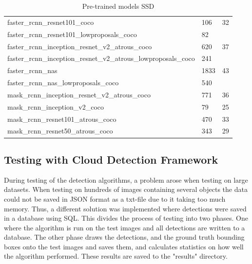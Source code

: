 \begin{table}[h!]
\begin{tabular}{lll}
faster\_rcnn\_resnet101\_coco                                   & 106         & 32                                \\
faster\_rcnn\_resnet101\_lowproposals\_coco                     & 82          &                                   \\
faster\_rcnn\_inception\_resnet\_v2\_atrous\_coco               & 620         & 37                                \\
faster\_rcnn\_inception\_resnet\_v2\_atrous\_lowproposals\_coco & 241         &                                   \\
faster\_rcnn\_nas                                               & 1833        & 43                                \\
faster\_rcnn\_nas\_lowproposals\_coco                           & 540         &                                   \\
mask\_rcnn\_inception\_resnet\_v2\_atrous\_coco                 & 771         & 36                                \\
mask\_rcnn\_inception\_v2\_coco                                 & 79          & 25                                \\
mask\_rcnn\_resnet101\_atrous\_coco                             & 470         & 33                                \\
mask\_rcnn\_resnet50\_atrous\_coco                              & 343         & 29                               
\end{tabular}
\caption{Pre-trained models SSD}
\label{ssd_tab}
\end{table}


\newpage

\subsection{Testing with Cloud Detection Framework}
During testing of the detection algorithms, a problem arose when testing on large datasets. When testing on hundreds of images containing several objects the data could not be saved in JSON format as a txt-file due to it taking too much memory. Thus, a different solution was implemented where detections were saved in a database using SQL. This divides the process of testing into two phases. One where the algorithm is run on the test images and all detections are written to a database. The other phase draws the detections, and the ground truth bounding boxes onto the test images and saves them, and calculates statistics on how well the algorithm performed. These results are saved to the "results" directory.


